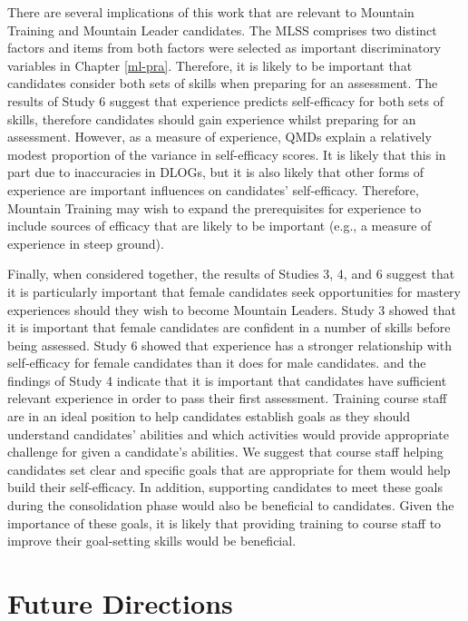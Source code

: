 \documentclass[
  12pt,
  a4paper,
]{book}
\begin{document}
There are several implications of this work that are relevant to Mountain Training and Mountain Leader candidates. The MLSS comprises two distinct factors and items from both factors were selected as important discriminatory variables in Chapter \ref{ml-pra}. Therefore, it is likely to be important that candidates consider both sets of skills when preparing for an assessment. The results of Study 6 suggest that experience predicts self-efficacy for both sets of skills, therefore candidates should gain experience whilst preparing for an assessment. However, as a measure of experience, QMDs explain a relatively modest proportion of the variance in self-efficacy scores. It is likely that this in part due to inaccuracies in DLOGs, but it is also likely that other forms of experience are important influences on candidates' self-efficacy. Therefore, Mountain Training may wish to expand the prerequisites for experience to include sources of efficacy that are likely to be important (e.g., a measure of experience in steep ground).

Finally, when considered together, the results of Studies 3, 4, and 6 suggest that it is particularly important that female candidates seek opportunities for mastery experiences should they wish to become Mountain Leaders. Study 3 showed that it is important that female candidates are confident in a number of skills before being assessed. Study 6 showed that experience has a stronger relationship with self-efficacy for female candidates than it does for male candidates. and the findings of Study 4 indicate that it is important that candidates have sufficient relevant experience in order to pass their first assessment. Training course staff are in an ideal position to help candidates establish goals as they should understand candidates' abilities and which activities would provide appropriate challenge for given a candidate's abilities. We suggest that course staff helping candidates set clear and specific goals that are appropriate for them would help build their self-efficacy. In addition, supporting candidates to meet these goals during the consolidation phase would also be beneficial to candidates. Given the importance of these goals, it is likely that providing training to course staff to improve their goal-setting skills would be beneficial.

\hypertarget{chapter-4-future-directions}{%
\section{Future Directions}\label{chapter-4-future-directions}}
\end{document}

